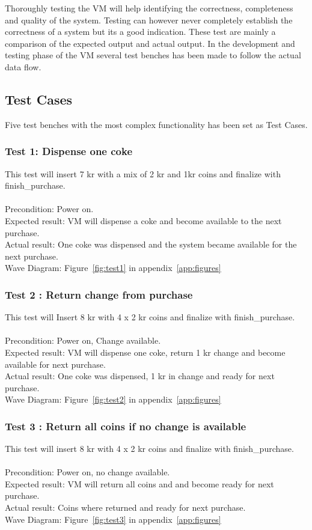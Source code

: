 Thoroughly testing the VM will help identifying the correctness, completeness and quality of the system. Testing can however never completely establish the correctness of a system but its a good indication. These test are mainly a comparison of the expected output and actual output.
In the development and testing phase of the VM several test benches has been made to follow the actual data flow.    

\subsection{Test Cases}
Five test benches with the most complex functionality has been set as Test Cases.
\subsubsection*{Test 1:  Dispense one coke}
This test will insert 7 kr with a mix of 2 kr and 1kr coins and finalize with finish\_purchase.\\
\\
Precondition: Power on.\\
Expected result: VM will dispense a coke and become available to the next purchase.\\
Actual result: One coke was dispensed and the system became available for the next purchase.\\
Wave Diagram: Figure~\ref{fig:test1} in appendix~\ref{app:figures}

\subsubsection*{Test 2 : Return change from purchase}
This test will Insert 8 kr with 4 x 2 kr coins and finalize with finish\_purchase.\\
\\
Precondition:  Power on, Change available.\\ 
Expected result:  VM will dispense one coke, return 1 kr change and become available for next purchase.\\
Actual result: One coke was dispensed, 1 kr in change and ready for next purchase.\\
Wave Diagram: Figure~\ref{fig:test2} in appendix~\ref{app:figures}

\subsubsection*{Test 3 : Return all coins if no change is available}
This test will insert 8 kr with 4 x 2 kr coins and finalize with finish\_purchase.\\
 \\
Precondition:  Power on, no change available.\\
Expected result: VM will return all coins and and become ready for next purchase.\\
Actual result: Coins where returned and ready for next purchase.\\
Wave Diagram: Figure~\ref{fig:test3} in appendix~\ref{app:figures}

